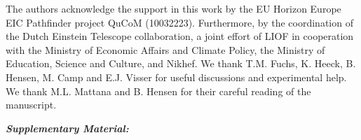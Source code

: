 \documentclass[%
reprint,
superscriptaddress,
 prl,
 amsmath,
 amssymb,
 aps,
 longbibliography
]{revtex4-2}
\begin{document}










%

\acknowledgments
The authors acknowledge the support in this work by the EU Horizon Europe EIC Pathfinder project QuCoM (10032223). Furthermore, by the coordination of the Dutch Einstein Telescope collaboration, a joint effort of LIOF in cooperation with the Ministry of Economic Affairs and Climate Policy, the Ministry of Education, Science and Culture, and Nikhef.
We thank T.M. Fuchs, K. Heeck, B. Hensen, M. Camp and E.J. Visser for useful discussions and experimental help. We thank M.L. Mattana and B. Hensen for their careful reading of the manuscript.





\clearpage
\onecolumngrid

\begin{center}
\large
\maketitle
\textbf{\textit{Supplementary Material:} \\ \titleinfo} \\
\vspace{1.75ex}
\authorinfo
\vspace{2ex}
\end{center}

\twocolumngrid

\appendix




\end{document}
